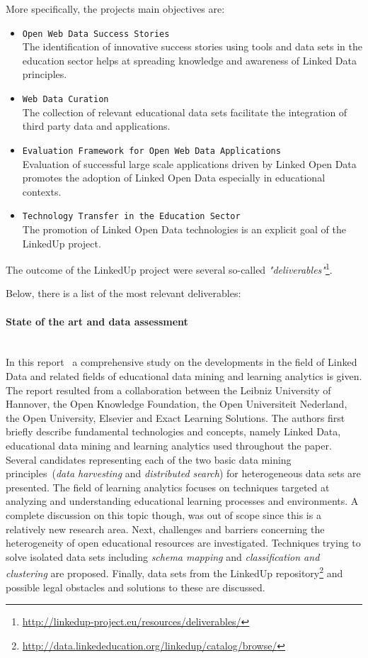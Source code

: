 \documentclass{article}
\begin{document}
More specifically, the projects main objectives are:
\begin{itemize}
	\item \texttt{Open Web Data Success Stories}~\\
	The identification of innovative success stories using tools and data sets in the education sector helps at spreading knowledge and awareness of Linked Data 
	principles. 
	\item \texttt{Web Data Curation}~\\
	The collection of relevant educational data sets facilitate the integration of third party data and applications. 
	\item \texttt{Evaluation Framework for Open Web Data Applications}~\\
	Evaluation of successful large scale applications driven by Linked Open Data promotes the adoption of Linked Open Data especially in educational contexts. 
	\item \texttt{Technology Transfer in the Education Sector}~\\
	The promotion of Linked Open Data technologies is an explicit goal of the LinkedUp project. 
\end{itemize}

The outcome of the LinkedUp project were several so-called \textit{"deliverables"}\footnote{\url{http://linkedup-project.eu/resources/deliverables/}}. 

Below, there is a list of the most relevant deliverables:
\paragraph{State of the art and data assessment}~\\
In this report~\cite{url:linkedup_state_of_the_art_and_data_assessment} a comprehensive study on the developments in the field of Linked Data and
related fields of educational data mining and learning analytics is given. The report resulted from a collaboration between the Leibniz University of Hannover, the Open Knowledge Foundation, the Open Universiteit Nederland, the Open University, Elsevier and Exact Learning Solutions. The authors first briefly describe fundamental technologies and concepts, namely Linked Data, educational data mining and learning analytics used throughout the paper. Several candidates representing each of the two basic data mining principles~(\textit{data harvesting} and \textit{distributed search}) for heterogeneous data sets are presented. The field of learning analytics focuses on techniques targeted at analyzing and understanding educational learning processes and environments. A complete discussion on this topic though, was out of scope since this is a relatively new research area. Next, challenges and barriers concerning the heterogeneity of open educational resources are investigated. Techniques trying to solve isolated data sets including \textit{schema mapping} and \textit{classification and clustering} are proposed. Finally, data sets from the LinkedUp repository\footnote{\url{http://data.linkededucation.org/linkedup/catalog/browse/}} and possible legal obstacles and solutions to these are discussed. 
\end{document}
